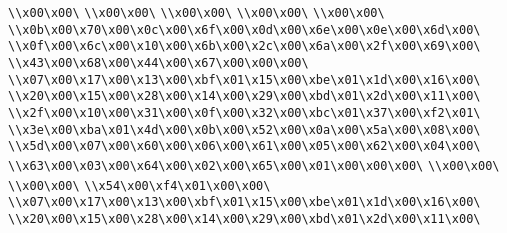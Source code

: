 \verb|\\x00\x00\|\newline
\verb|\\x00\x00\|\newline
\verb|\\x00\x00\|\newline
\verb|\\x00\x00\|\newline
\verb|\\x00\x00\|\newline
\verb|\\x0b\x00\x70\x00\x0c\x00\x6f\x00\x0d\x00\x6e\x00\x0e\x00\x6d\x00\|\newline
\verb|\\x0f\x00\x6c\x00\x10\x00\x6b\x00\x2c\x00\x6a\x00\x2f\x00\x69\x00\|\newline
\verb|\\x43\x00\x68\x00\x44\x00\x67\x00\x00\x00\|\newline
\verb|\\x07\x00\x17\x00\x13\x00\xbf\x01\x15\x00\xbe\x01\x1d\x00\x16\x00\|\newline
\verb|\\x20\x00\x15\x00\x28\x00\x14\x00\x29\x00\xbd\x01\x2d\x00\x11\x00\|\newline
\verb|\\x2f\x00\x10\x00\x31\x00\x0f\x00\x32\x00\xbc\x01\x37\x00\xf2\x01\|\newline
\verb|\\x3e\x00\xba\x01\x4d\x00\x0b\x00\x52\x00\x0a\x00\x5a\x00\x08\x00\|\newline
\verb|\\x5d\x00\x07\x00\x60\x00\x06\x00\x61\x00\x05\x00\x62\x00\x04\x00\|\newline
\verb|\\x63\x00\x03\x00\x64\x00\x02\x00\x65\x00\x01\x00\x00\x00\|\newline
\verb|\\x00\x00\|\newline
\verb|\\x00\x00\|\newline
\verb|\\x54\x00\xf4\x01\x00\x00\|\newline
\verb|\\x07\x00\x17\x00\x13\x00\xbf\x01\x15\x00\xbe\x01\x1d\x00\x16\x00\|\newline
\verb|\\x20\x00\x15\x00\x28\x00\x14\x00\x29\x00\xbd\x01\x2d\x00\x11\x00\|\newline
